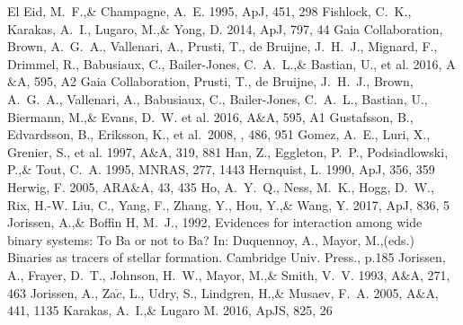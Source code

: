 \documentclass[a4paper,fleqn,usenatbib]{mnras}
\begin{document}
\begin{thebibliography}{99}
El Eid, M.~F.,\& Champagne, A.~E. 1995, 
ApJ, 451, 298
Fishlock, C.~K., Karakas, A.~I., Lugaro, M.,\& Yong, D. 2014, 
ApJ, 797, 44
Gaia Collaboration, Brown, A.~G.~A., Vallenari, A., Prusti, T., de Bruijne, J.~H.~J., Mignard, F., Drimmel, R., Babusiaux, C., Bailer-Jones, C.~A.~L.,\& Bastian, U., et al. 2016, 
A$\&$A, 595, A2
Gaia Collaboration, Prusti, T., de Bruijne, J.~H.~J., Brown, A.~G.~A., Vallenari, A., Babusiaux, C., Bailer-Jones, C.~A.~L., Bastian, U., Biermann, M.,\& Evans, D.~W. et al. 2016, 
A$\&$A, 595, A1
 Gustafsson, B., Edvardsson, B., Eriksson, K., et al.\ 2008, \aap, 486, 951 
Gomez, A.~E., Luri, X., Grenier, S., et al. 1997, 
A$\&$A, 319, 881
Han, Z., Eggleton, P.~P., Podsiadlowski, P.,\& Tout, C.~A. 1995, 
MNRAS, 277, 1443
Hernquist, L. 1990, 
ApJ, 356, 359
Herwig, F. 2005, 
ARA$\&$A, 43, 435
Ho, A.~Y.~Q., Ness, M.~K., Hogg, D.~W., Rix, H.-W. Liu, C., Yang, F., Zhang, Y., Hou, Y.,\& Wang, Y. 2017, 
ApJ, 836, 5
Jorissen, A.,\& Boffin H, M.~J., 1992, 
Evidences for interaction among wide binary systems: To Ba or not to Ba? In: Duquennoy, A., Mayor, M.,(eds.) Binaries as tracers of stellar formation. Cambridge Univ. Press., p.185
Jorissen, A., Frayer, D.~T., Johnson, H.~W., Mayor, M.,\& Smith, V.~V. 1993, 
A$\&$A, 271, 463
Jorissen, A., Za$\check{c}$, L., Udry, S., Lindgren, H.,\& Musaev, F.~A. 2005, 
A$\&$A, 441, 1135
Karakas, A.~I.,\& Lugaro M. 2016, 
ApJS, 825, 26

\end{thebibliography}
\end{document}
